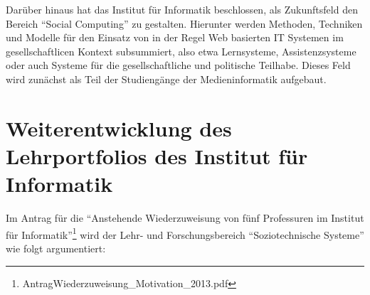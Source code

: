 Darüber hinaus hat das Institut für Informatik beschlossen, als
Zukunftsfeld den Bereich ``Social Computing'' zu gestalten. Hierunter
werden Methoden, Techniken und Modelle für den Einsatz von in der Regel
Web basierten IT Systemen im gesellschaftlicen Kontext subsummiert, also
etwa Lernsysteme, Assistenzsysteme oder auch Systeme für die
gesellschaftliche und politische Teilhabe. Dieses Feld wird zunächst als
Teil der Studiengänge der Medieninformatik aufgebaut.

\section{Weiterentwicklung des Lehrportfolios des Institut für
Informatik}\label{weiterentwicklung-des-lehrportfolios-des-institut-fuxfcr-informatik}

Im Antrag für die ``Anstehende Wiederzuweisung von fünf Professuren im
Institut für Informatik''\footnote{AntragWiederzuweisung\_Motivation\_2013.pdf}
wird der Lehr- und Forschungsbereich ``Soziotechnische Systeme'' wie
folgt argumentiert:

